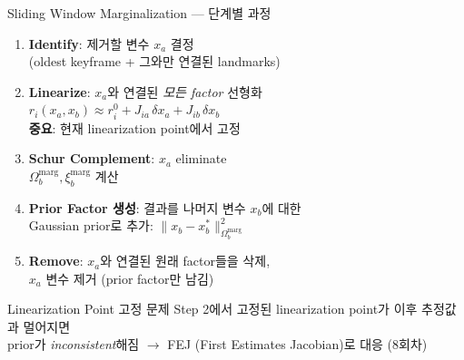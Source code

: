 \begin{frame}{Sliding Window Marginalization — 단계별 과정}
  \begin{enumerate}
    \setlength\itemsep{0.4em}
    \item \textbf{Identify}: 제거할 변수 $x_a$ 결정\\
      (oldest keyframe + 그와만 연결된 landmarks)
    \pause
    \item \textbf{Linearize}: $x_a$와 연결된 \emph{모든 factor} 선형화\\
      $r_i(x_a, x_b) \approx r_i^0 + J_{ia}\,\delta x_a + J_{ib}\,\delta x_b$\\
      \textbf{중요}: 현재 linearization point에서 고정
    \pause
    \item \textbf{Schur Complement}: $x_a$ eliminate\\
      $\Omega_b^{\mathrm{marg}}, \xi_b^{\mathrm{marg}}$ 계산
    \pause
    \item \textbf{Prior Factor 생성}: 결과를 나머지 변수 $x_b$에 대한\\
      Gaussian prior로 추가: $\|x_b - x_b^*\|_{\Omega_b^{\mathrm{marg}}}^2$
    \pause
    \item \textbf{Remove}: $x_a$와 연결된 원래 factor들을 삭제,\\
      $x_a$ 변수 제거 (prior factor만 남김)
  \end{enumerate}
  \pause
  \begin{alertblock}{Linearization Point 고정 문제}
    Step 2에서 고정된 linearization point가 이후 추정값과 멀어지면\\
    prior가 \emph{inconsistent}해짐 $\to$ FEJ (First Estimates Jacobian)로 대응 (8회차)
  \end{alertblock}
\end{frame}

